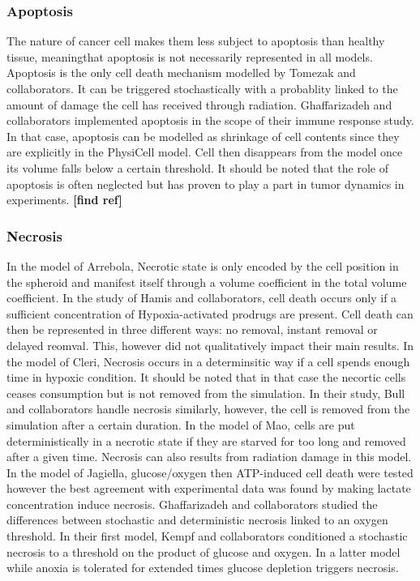 \documentclass[11pt,a4paper]{article}
\begin{document}
\subsubsection{Apoptosis}
The nature of cancer cell makes them less subject to apoptosis than healthy tissue, meaningthat apoptosis is not necessarily represented in all models.\cite{Arrebola2020}\cite{Hamis2020}\cite{Cleri2019}\cite{Bull2020}\cite{Mao2018} Apoptosis is the only cell death mechanism modelled by Tomezak and collaborators.\cite{Tomezak2015} It can be triggered stochastically with a probablity linked to the amount of damage the cell has received through radiation. Ghaffarizadeh and collaborators implemented apoptosis in the scope of their immune response study.\cite{Ghaffarizadeh2017} In that case, apoptosis can be modelled as shrinkage of cell contents since they are explicitly in the PhysiCell model. Cell then disappears from the model once its volume falls below a certain threshold. It should be noted that the role of apoptosis is often neglected but has proven to play a part in tumor dynamics in experiments. \textbf{[find ref]}

\subsubsection{Necrosis}
In the model of Arrebola, Necrotic state is only encoded by the cell position in the spheroid and manifest itself through a volume coefficient in the total volume coefficient.\cite{Arrebola2020} In the study of Hamis and collaborators, cell death occurs only if a sufficient concentration of Hypoxia-activated prodrugs are present.\cite{Hamis2020} Cell death can then be represented in three different ways: no removal, instant removal or delayed reomval. This, however did not qualitatively impact their main results. In the model of Cleri, Necrosis occurs in a determinsitic  way if a cell spends enough time in hypoxic condition.\cite{Cleri2019} It should be noted that in that case the necortic cells ceases consumption but is not removed from the simulation. In their study, Bull and collaborators handle necrosis similarly, however, the cell is removed from the simulation after a certain duration.\cite{Bull2020} In the  model of Mao, cells are put deterministically in a necrotic state if they are starved for too long and removed after a given time.\cite{Mao2018} Necrosis can also results from radiation damage in this model. In the model of Jagiella, glucose/oxygen then ATP-induced cell death were tested however the best agreement with experimental data was found by making lactate concentration induce necrosis.\cite{Jagiella2016} Ghaffarizadeh and collaborators studied the differences between stochastic and deterministic necrosis linked to an oxygen threshold.\cite{Ghaffarizadeh2017} In their first model, Kempf and collaborators conditioned a stochastic necrosis to a threshold on the product of glucose and oxygen.\cite{Kempf2005} In a latter model while anoxia is tolerated for extended times glucose depletion triggers necrosis.\cite{Kempf2015}
\end{document}
